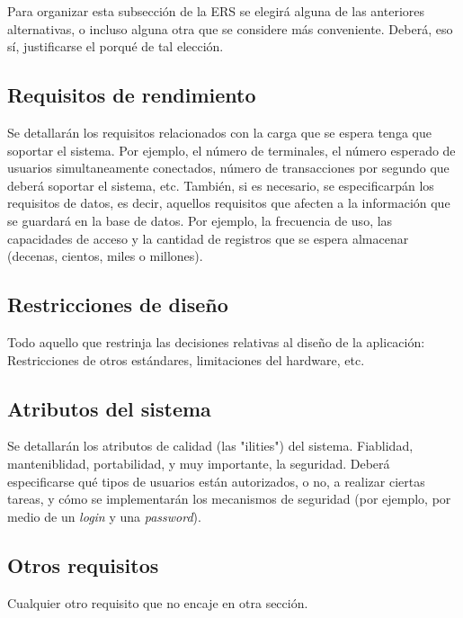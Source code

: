 \documentclass[12pt,a4paper, twosite]{book}
\begin{document}
Para organizar esta subsección de la ERS se elegirá alguna de las
anteriores alternativas, o incluso alguna otra que se considere más
conveniente. Deberá, eso sí, justificarse el porqué de tal elección.



\subsection{Requisitos de rendimiento}
\label{sec:org94bc543}

Se detallarán los requisitos relacionados con la carga que se espera
tenga que soportar el sistema. Por ejemplo, el número de terminales,
el número esperado de usuarios simultaneamente conectados, número de
transacciones por segundo que deberá soportar el sistema, etc.
  También, si es necesario, se especificarpán los requisitos de
datos, es decir, aquellos requisitos que afecten a la información
que se guardará en la base de datos. Por ejemplo, la frecuencia de
uso, las capacidades de acceso y la cantidad de registros que se
espera almacenar (decenas, cientos, miles o millones).


\subsection{Restricciones de diseño}
\label{sec:org49fe900}


Todo aquello que restrinja las decisiones relativas al diseño de la
aplicación: Restricciones de otros estándares, limitaciones del
hardware, etc.


\subsection{Atributos del sistema}
\label{sec:orgd0babc0}

Se detallarán los atributos de calidad (las "ilities") del
sistema. Fiablidad, manteniblidad, portabilidad, y muy importante,
la seguridad. Deberá especificarse qué tipos de usuarios están
autorizados, o no, a realizar ciertas tareas, y cómo se
implementarán los mecanismos de seguridad (por ejemplo, por medio de
un \emph{login} y una \emph{password}).


\subsection{Otros requisitos}
\label{sec:org31d2978}

Cualquier otro requisito que no encaje en otra sección.
\end{document}

